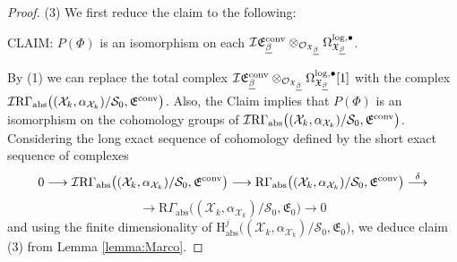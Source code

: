 \documentclass[asterisque,english]{smfart}
\begin{document}
\begin{proof}
(3) We first reduce the claim to the following:

\smallskip
CLAIM:  $P(\Phi)$ is an isomorphism on each  $\mathcal{I} \mathfrak{E}^{\rm conv}_{\underline{\beta}}\otimes_{\mathcal{O}_{\mathfrak{X}_{\underline{\beta}}}} \Omega^{\log,\bullet}_{\mathfrak{X}_{\underline{\beta}}} $.
\smallskip


\noindent 
By (1) we can replace the total complex $\mathcal{I} \mathfrak{E}^{\rm conv}_{\underline{\beta}}\otimes_{\mathcal{O}_{\mathfrak{X}_{\underline{\beta}}}} \Omega^{\log,\bullet}_{\mathfrak{X}_{\underline{\beta}}}[1]$ with the complex
$\mathcal{I}  \mathrm{R}\Gamma_{\mathrm{abs}}\bigl((\mathcal{X}_k,\alpha_{\mathcal{X}_k})/\mathcal{S}_0,\mathfrak{E}^{\rm conv}\bigr)$. Also,  the Claim implies that $P(\Phi)$ is an isomorphism on the cohomology groups of  $\mathcal{I}  \mathrm{R}\Gamma_{\mathrm{abs}}\bigl((\mathcal{X}_k,\alpha_{\mathcal{X}_k})/\mathcal{S}_0,\mathfrak{E}^{\rm conv}\bigr)$. Considering the long exact sequence of cohomology defined by the short exact sequence of complexes $$0 \longrightarrow \mathcal{I}  \mathrm{R}\Gamma_{\mathrm{abs}}\bigl((\mathcal{X}_k,\alpha_{\mathcal{X}_k})/\mathcal{S}_0,\mathfrak{E}^{\rm conv}\bigr) \longrightarrow  \mathrm{R}\Gamma_{\mathrm{abs}}\bigl((\mathcal{X}_k,\alpha_{\mathcal{X}_k})/\mathcal{S}_0,\mathfrak{E}^{\rm conv}\bigr) \stackrel{\delta}{\longrightarrow} $$ $$\longrightarrow \mathrm{R}\Gamma_{\mathrm{abs}}\bigl((\mathcal{X}_k,\alpha_{\mathcal{X}_k})/\mathcal{S}_0,\mathfrak{E}_0\bigr) \longrightarrow 0$$and using the finite dimensionality of $\mathrm{H}^j_{\mathrm{abs}}\bigl((\mathcal{X}_k,\alpha_{\mathcal{X}_k})/\mathcal{S}_0,\mathfrak{E}_0\bigr)$,  we deduce claim (3) from Lemma \ref{lemma:Marco}. 


\end{proof}
\end{document}
